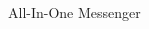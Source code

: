 \begin{frame}{All-In-One Messenger}
  \begin{columns}
    \begin{column}{0.5\textwidth}
      
    \end{column}
    \begin{column}{0.5\textwidth}
      
    \end{column}
  \end{columns}
\end{frame}


